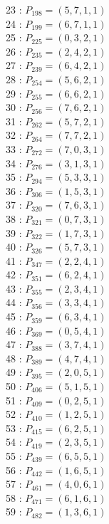 \documentclass{article}
\begin{document}
{\begin{multicols}{3}
23 : $P_{198}=( 5, 7, 1, 1 )$\\
24 : $P_{199}=( 6, 7, 1, 1 )$\\
25 : $P_{225}=( 0, 3, 2, 1 )$\\
26 : $P_{235}=( 2, 4, 2, 1 )$\\
27 : $P_{239}=( 6, 4, 2, 1 )$\\
28 : $P_{254}=( 5, 6, 2, 1 )$\\
29 : $P_{255}=( 6, 6, 2, 1 )$\\
30 : $P_{256}=( 7, 6, 2, 1 )$\\
31 : $P_{262}=( 5, 7, 2, 1 )$\\
32 : $P_{264}=( 7, 7, 2, 1 )$\\
33 : $P_{272}=( 7, 0, 3, 1 )$\\
34 : $P_{276}=( 3, 1, 3, 1 )$\\
35 : $P_{294}=( 5, 3, 3, 1 )$\\
36 : $P_{306}=( 1, 5, 3, 1 )$\\
37 : $P_{320}=( 7, 6, 3, 1 )$\\
38 : $P_{321}=( 0, 7, 3, 1 )$\\
39 : $P_{322}=( 1, 7, 3, 1 )$\\
40 : $P_{326}=( 5, 7, 3, 1 )$\\
41 : $P_{347}=( 2, 2, 4, 1 )$\\
42 : $P_{351}=( 6, 2, 4, 1 )$\\
43 : $P_{355}=( 2, 3, 4, 1 )$\\
44 : $P_{356}=( 3, 3, 4, 1 )$\\
45 : $P_{359}=( 6, 3, 4, 1 )$\\
46 : $P_{369}=( 0, 5, 4, 1 )$\\
47 : $P_{388}=( 3, 7, 4, 1 )$\\
48 : $P_{389}=( 4, 7, 4, 1 )$\\
49 : $P_{395}=( 2, 0, 5, 1 )$\\
50 : $P_{406}=( 5, 1, 5, 1 )$\\
51 : $P_{409}=( 0, 2, 5, 1 )$\\
52 : $P_{410}=( 1, 2, 5, 1 )$\\
53 : $P_{415}=( 6, 2, 5, 1 )$\\
54 : $P_{419}=( 2, 3, 5, 1 )$\\
55 : $P_{439}=( 6, 5, 5, 1 )$\\
56 : $P_{442}=( 1, 6, 5, 1 )$\\
57 : $P_{461}=( 4, 0, 6, 1 )$\\
58 : $P_{471}=( 6, 1, 6, 1 )$\\
59 : $P_{482}=( 1, 3, 6, 1 )$\\

\end{multicols}}
\end{document}
